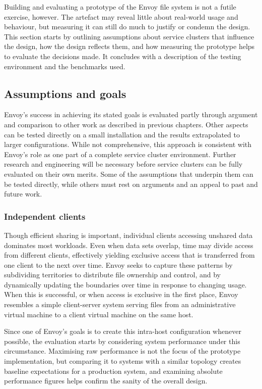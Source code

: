Building and evaluating a prototype of the Envoy file system is not a futile exercise, however. The artefact may reveal little about real-world usage and behaviour, but measuring it can still do much to justify or condemn the design. This section starts by outlining assumptions about service clusters that influence the design, how the design reflects them, and how measuring the prototype helps to evaluate the decisions made. It concludes with a description of the testing environment and the benchmarks used.

\subsection{Assumptions and goals}

Envoy's success in achieving its stated goals is evaluated partly through argument and comparison to other work as described in previous chapters. Other aspects can be tested directly on a small installation and the results extrapolated to larger configurations. While not comprehensive, this approach is consistent with Envoy's role as one part of a complete service cluster environment. Further research and engineering will be necessary before service clusters can be fully evaluated on their own merits. Some of the assumptions that underpin them can be tested directly, while others must rest on arguments and an appeal to past and future work.

\subsubsection{Independent clients}

Though efficient sharing is important, individual clients accessing unshared data dominates most workloads. Even when data sets overlap, time may divide access from different clients, effectively yielding exclusive access that is transferred from one client to the next over time. Envoy seeks to capture these patterns by subdividing territories to distribute file ownership and control, and by dynamically updating the boundaries over time in response to changing usage. When this is successful, or when access is exclusive in the first place, Envoy resembles a simple client-server system serving files from an administrative virtual machine to a client virtual machine on the same host.

Since one of Envoy's goals is to create this intra-host configuration whenever possible, the evaluation starts by considering system performance under this circumstance. Maximising raw performance is not the focus of the prototype implementation, but comparing it to systems with a similar topology creates baseline expectations for a production system, and examining absolute performance figures helps confirm the sanity of the overall design.

